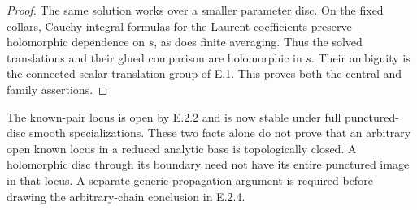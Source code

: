 \begin{proof}
The same solution works over a smaller parameter
disc.  On the fixed collars, Cauchy integral
formulas for the Laurent coefficients preserve
holomorphic dependence on $s$, as does finite
averaging.  Thus the solved translations and
their glued comparison are holomorphic in
$s$.  Their ambiguity is the connected
scalar translation group of E.1.  This
proves both the central and family assertions.
\end{proof}

\begin{remark}[Scope of E.2.21]
The known-pair locus is open by E.2.2 and
is now stable under full punctured-disc
smooth specializations.  These two facts
alone do not prove that an arbitrary open
known locus in a reduced analytic base
is topologically closed.  A holomorphic
disc through its boundary need not have
its entire punctured image in that locus.
A separate generic propagation argument
is required before drawing the
arbitrary-chain conclusion in E.2.4.
\end{remark}
